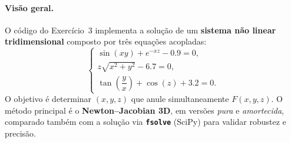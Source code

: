 \documentclass[12pt,a4paper]{article}
\begin{document}
\paragraph{Visão geral.}
O código do Exercício~3 implementa a solução de um \textbf{sistema não linear tridimensional} composto por três equações acopladas:
\[
\begin{cases}
\sin(xy) + e^{-xz} - 0.9 = 0,\\
z\sqrt{x^2 + y^2} - 6.7 = 0,\\
\tan\!\left(\dfrac{y}{x}\right) + \cos(z) + 3.2 = 0.
\end{cases}
\]
O objetivo é determinar \((x, y, z)\) que anule simultaneamente \(F(x,y,z)\).
O método principal é o \textbf{Newton–Jacobian 3D}, em versões \emph{pura} e \emph{amortecida}, comparado também com a solução via \textbf{\texttt{fsolve}} (SciPy) para validar robustez e precisão.
\end{document}
